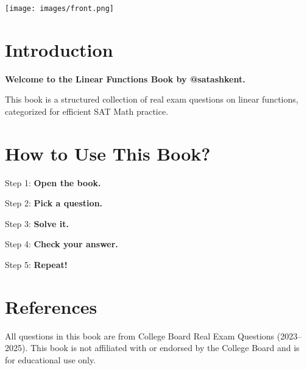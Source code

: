 \documentclass[12pt]{exam}
\begin{document}
\thispagestyle{empty}
\begin{center}
    \texttt{[image: images/front.png]}
\end{center}
\restoregeometry
\newpage
\vspace*{\fill}
\begin{center}
    {\textcolor{RAL3003}{}}
\end{center}
\vspace*{\fill}
\newpage

\tableofcontents
\newpage

\section*{Introduction}
{\large \textbf{\textcolor{RAL3003}{Welcome to the Linear Functions Book by @satashkent.}}

This book is a structured collection of real exam questions on linear functions, categorized for efficient SAT Math practice.}

\newpage

\section*{How to Use This Book?}
{\large Step 1: \textbf{\textcolor{RAL3003}{Open the book.}}

Step 2: \textbf{\textcolor{RAL3003}{Pick a question.}}

Step 3: \textbf{\textcolor{RAL3003}{Solve it.}}

Step 4: \textbf{\textcolor{RAL3003}{Check your answer.}}

Step 5: \textbf{\textcolor{RAL3003}{Repeat!}}}

\newpage

\section*{References}
{\large All questions in this book are from College Board Real Exam Questions (2023–2025). This book is not affiliated with or endorsed by the College Board and is for educational use only.}

\newpage
\thispagestyle{empty}
\vspace*{\fill}
\begin{center}
    {\textcolor{RAL3003}{}}
\end{center}
\vspace*{\fill}
\newpage
\end{document}
